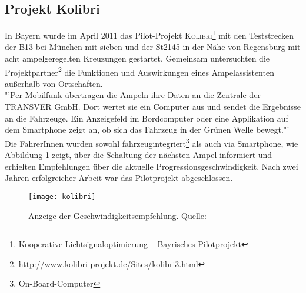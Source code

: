\subsection*{\label{sec:kolibri}Projekt Kolibri}
In Bayern wurde im April 2011 das Pilot-Projekt \textsc{Kolibri}\footnote{ Kooperative Lichtsignaloptimierung -- Bayrisches Pilotprojekt} mit den Teststrecken der B13 bei München mit sieben und der St2145 in der Nähe von Regensburg mit acht ampelgeregelten Kreuzungen gestartet. Gemeinsam untersuchten die Projektpartner\footnote{ \url{http://www.kolibri-projekt.de/Sites/kolibri3.html}} die Funktionen und Auswirkungen eines Ampelassistenten außerhalb von Ortschaften. \cite{kolibri}\\ 
"'Per Mobilfunk übertragen die Ampeln ihre Daten an die Zentrale der TRANSVER GmbH. Dort wertet sie ein Computer aus und sendet die Ergebnisse an die Fahrzeuge. Ein Anzeigefeld im Bordcomputer oder eine Applikation auf dem \gls{Smartphone} zeigt an, ob sich das Fahrzeug in der Grünen Welle bewegt."' \cite{kolibriTUM}\\
Die FahrerInnen wurden sowohl fahrzeugintegriert\footnote{ On-Board-Computer} als auch via \gls{Smartphone}, wie Abbildung \ref{fig:kolibri} zeigt, über die Schaltung der nächsten Ampel informiert und erhielten Empfehlungen über die aktuelle Progressionsgeschwindigkeit. Nach zwei Jahren erfolgreicher Arbeit war das Pilotprojekt abgeschlossen.\\
\begin{figure}[H]  
    \centering  
    \texttt{[image: kolibri]}   
    \grayRule
    \caption[Projekt Kolibri]{Anzeige der Geschwindigkeitsempfehlung. Quelle: \cite{kolibri}}
    \label{fig:kolibri}
\end{figure} 
